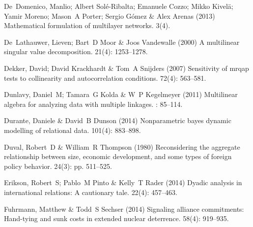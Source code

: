 \documentclass[3p,times,twocolumn,authoryear,12pt]{elsarticle}
\begin{document}
\begin{thebibliography}{}
De~Domenico, Manlio; Albert Sol{\'e}-Ribalta; Emanuele Cozzo; Mikko Kivel{\"a};
  Yamir Moreno; Mason~A Porter; Sergio G{\'o}mez  \& Alex Arenas (2013)
  Mathematical formulation of multilayer networks.
 { 3\/}(4).

De~Lathauwer, Lieven; Bart~D Moor  \& Joos Vandewalle (2000) A multilinear
  singular value decomposition.
 { 21\/}(4):
  1253--1278.

Dekker, David; David Krackhardt  \& Tom~A Snijders (2007) Sensitivity of mrqap
  tests to collinearity and autocorrelation conditions.
 { 72\/}(4): 563--581.

Dunlavy, Daniel~M; Tamara~G Kolda  \& W~P Kegelmeyer (2011) Multilinear algebra
  for analyzing data with multiple linkages.
:
  85--114.

Durante, Daniele  \& David~B Dunson (2014) Nonparametric bayes dynamic
  modelling of relational data.
 { 101\/}(4): 883--898.

Duval, Robert~D  \& William~R Thompson (1980) Reconsidering the aggregate
  relationship between size, economic development, and some types of foreign
  policy behavior.
 { 24\/}(3): pp. 511--525.

Erikson, Robert~S; Pablo~M Pinto  \& Kelly~T Rader (2014) Dyadic analysis in
  international relations: A cautionary tale.
 { 22\/}(4): 457--463.

Fuhrmann, Matthew  \& Todd~S Sechser (2014) Signaling alliance commitments:
  Hand-tying and sunk costs in extended nuclear deterrence.
 { 58\/}(4): 919--935.


\end{thebibliography}
\end{document}
